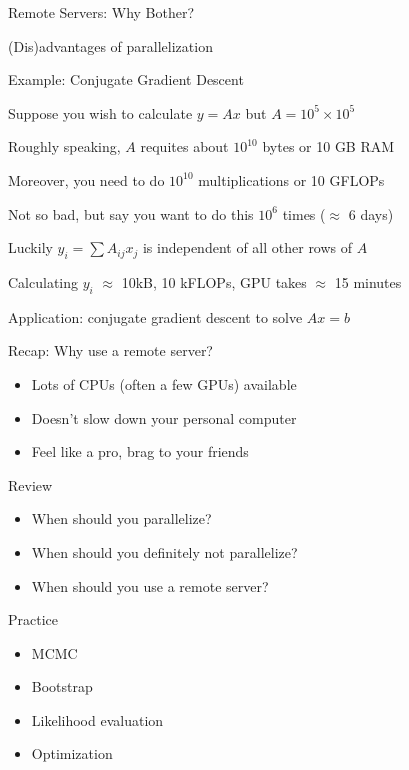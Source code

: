\documentclass[ignorenonframetext,]{beamer}
\providecommand{\tightlist}{%
  \setlength{\itemsep}{0pt}\setlength{\parskip}{0pt}}
\begin{document}
\begin{frame}{Remote Servers: Why Bother?}
\begin{block}{(Dis)advantages of parallelization}
\end{block}

\begin{block}{Example: Conjugate Gradient Descent}

Suppose you wish to calculate \(y = Ax\) but \(A = 10^5 \times 10^5\)

Roughly speaking, \(A\) requites about \(10^{10}\) bytes or 10 GB RAM

Moreover, you need to do \(10^{10}\) multiplications or 10 GFLOPs

Not so bad, but say you want to do this \(10^6\) times (\(\approx\) 6
days)

Luckily \(y_i = \sum A_{ij}x_j\) is independent of all other rows of
\(A\)

Calculating \(y_i\) \(\approx\) 10kB, 10 kFLOPs, GPU takes \(\approx\)
15 minutes

Application: conjugate gradient descent to solve \(Ax = b\)

\end{block}

\begin{block}{Recap: Why use a remote server?}

\begin{itemize}[<+->]
\tightlist
\item
  Lots of CPUs (often a few GPUs) available
\item
  Doesn't slow down your personal computer
\item
  Feel like a pro, brag to your friends
\end{itemize}

\end{block}

\begin{block}{Review}

\begin{itemize}[<+->]
\tightlist
\item
  When should you parallelize?
\item
  When should you definitely not parallelize?
\item
  When should you use a remote server?
\end{itemize}

\end{block}

\begin{block}{Practice}

\begin{itemize}[<+->]
\tightlist
\item
  MCMC
\item
  Bootstrap
\item
  Likelihood evaluation
\item
  Optimization
\end{itemize}

\end{block}

\end{frame}
\end{document}
